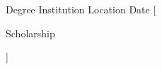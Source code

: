 

\begin{cventries}

  \cventry
    {Degree} %
    {Institution} %
    {Location} %
    {Date} %
    [
      \begin{cvitems} %
        \item {Scholarship}
      \end{cvitems}
    ]

\end{cventries}
